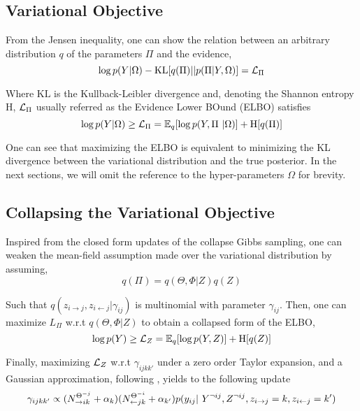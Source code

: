 \subsection{Variational Objective}

From the Jensen inequality, one can show the relation between an arbitrary distribution $q$ of the parameters $\Pi$ and the evidence, 
\begin{equation*}
\log p(Y | \Omega) - \textrm{KL}[q(\Pi)||p(\Pi | Y, \Omega)] = \mathcal{L}_\Pi
\end{equation*}

Where $\textrm{KL}$ is the Kullback-Leibler divergence and, denoting the Shannon entropy $\textrm{H}$, $\mathcal{L}_\Pi$ usually referred as the Evidence Lower BOund (ELBO) satisfies
\begin{equation*}
\log p(Y|\Omega) \geq \mathcal{L}_\Pi = \mathbb{E}_{q}[\log p(Y, \Pi\ | \Omega)] + \textrm{H}[q(\Pi)] 
\end{equation*}

One can see that maximizing the ELBO is equivalent to minimizing the KL divergence between the variational distribution and the true posterior.
In the next sections, we will omit the reference to the hyper-parameters $\Omega$ for brevity.

\subsection{Collapsing the Variational Objective}
Inspired from the closed form updates of the collapse Gibbs sampling, one can weaken the mean-field assumption made over the variational distribution by assuming,
\begin{equation*}
q(\Pi) = q(\Theta, \Phi | Z) q(Z)
\end{equation*}

Such that $q(z_{i \rightarrow j}, z_{i \leftarrow j}|\gamma_{ij})$ is multinomial with parameter $\gamma_{ij}$. Then, one can maximize $L_\Pi$ w.r.t $q(\Theta, \Phi | Z)$ to obtain a collapsed form of the ELBO,
\begin{equation*}
\log p(Y) \geq \mathcal{L}_Z = \mathbb{E}_{q}[\log p(Y, Z)] + \textrm{H}[q(Z)]
\end{equation*}

Finally, maximizing $\mathcal{L}_Z$ w.r.t $\gamma_{ijkk'}$ under a zero order Taylor expansion, and a Gaussian approximation, following \cite{teh2006collapsed}\cite{asuncion2009smoothing}, yields to the following update
\begin{equation} \label{eq:maximization}
\gamma_{ijkk'} \propto (N_{\rightarrow ik}^{\Theta^{-j}} + \alpha_k) (N_{\leftarrow jk}^{\Theta^{-i}} + \alpha_{k'}) p(y_{ij} | Y^{\neg ij}, Z^{\neg ij}, \zij=k, \zji=k')
\end{equation}

